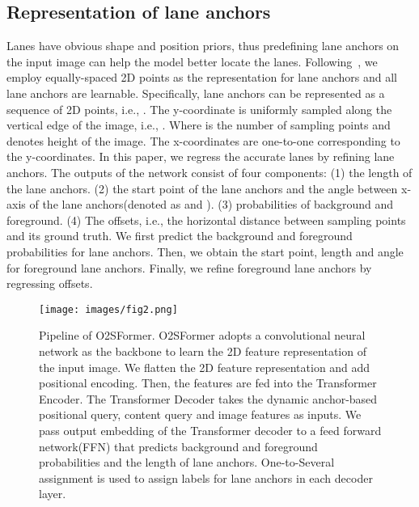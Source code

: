 \documentclass{bmvc2k}
\begin{document}
\subsection{Representation of lane anchors}
\label{sec:rep}
Lanes have obvious shape and position priors, thus predefining lane anchors on the input 
image can help the model better locate the lanes. Following~\cite{zheng2022clrnet}, we employ equally-spaced 
2D points as the representation for lane anchors and all lane anchors are learnable. 
Specifically, lane anchors can be represented as a sequence of 2D points, i.e., .
The y-coordinate is uniformly sampled along the vertical edge of the image, i.e.,
. Where  is the number of sampling points and  denotes height of the image.
The x-coordinates are one-to-one corresponding to the y-coordinates. In this paper, 
we regress the accurate lanes by refining lane anchors. The outputs of the network 
consist of four components: (1) the length of the lane anchors. (2) the start point of 
the lane anchors and the angle between x-axis of the lane anchors(denoted as  and ). 
(3) probabilities of background and foreground. (4) The  offsets, i.e., the horizontal distance 
between  sampling points and its ground truth. We first predict the background and foreground 
probabilities for lane anchors. Then, we obtain the start point, length and angle 
for foreground lane anchors. Finally, we refine foreground lane anchors by regressing  offsets.

\begin{figure*}[!h]
   \begin{center}
   \texttt{[image: images/fig2.png]}
   \vspace{-0.5cm} 
   \end{center}
      \caption{Pipeline of O2SFormer. O2SFormer adopts a convolutional neural network as the backbone 
               to learn the 2D feature representation of the input image. We flatten the 2D feature 
               representation and add positional encoding. Then, the features are fed into the Transformer 
               Encoder. The Transformer Decoder takes the dynamic anchor-based positional query, content query 
               and image features as inputs. We pass output embedding of the Transformer decoder to a feed forward network(FFN) 
               that predicts background and foreground probabilities and the length of lane anchors. One-to-Several assignment is used to assign labels for lane anchors in each decoder layer.}
   \vspace{0.2cm}
   \label{fig:short2}
   \end{figure*}
\end{document}
